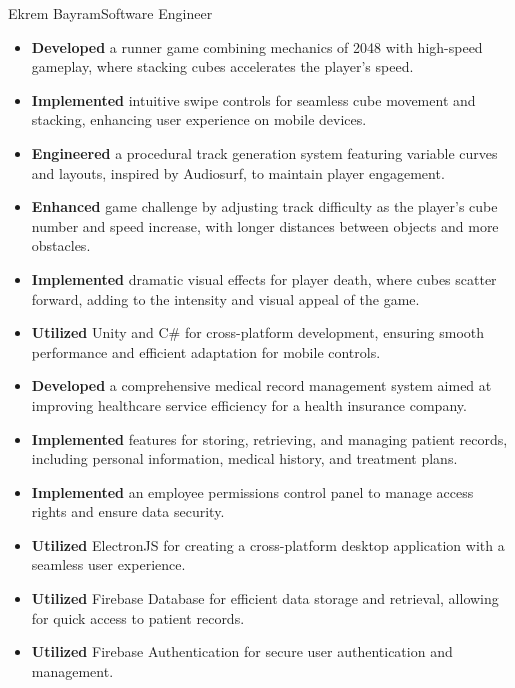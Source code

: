 \documentclass{article}
\begin{document}
\begin{cv}[avatar]{Ekrem Bayram}{Software Engineer}
    \cvseparator[2]
    \begin{cvevent}[2021]
        \begin{itemize}
            \item \textbf{Developed} a runner game combining mechanics of 2048 with high-speed gameplay, where stacking cubes accelerates the player's speed.
            \item \textbf{Implemented} intuitive swipe controls for seamless cube movement and stacking, enhancing user experience on mobile devices.
            \item \textbf{Engineered} a procedural track generation system featuring variable curves and layouts, inspired by Audiosurf, to maintain player engagement.
            \item \textbf{Enhanced} game challenge by adjusting track difficulty as the player's cube number and speed increase, with longer distances between objects and more obstacles.
            \item \textbf{Implemented} dramatic visual effects for player death, where cubes scatter forward, adding to the intensity and visual appeal of the game.
            \item \textbf{Utilized} Unity and C\# for cross-platform development, ensuring smooth performance and efficient adaptation for mobile controls.
        \end{itemize}
    \end{cvevent}

    \cvseparator[2]
    \begin{cvevent}[2021]
        \begin{itemize}
            \item \textbf{Developed} a comprehensive medical record management system aimed at improving healthcare service efficiency for a health insurance company.
            \item \textbf{Implemented} features for storing, retrieving, and managing patient records, including personal information, medical history, and treatment plans.
            \item \textbf{Implemented} an employee permissions control panel to manage access rights and ensure data security.
            \item \textbf{Utilized} ElectronJS for creating a cross-platform desktop application with a seamless user experience.
            \item \textbf{Utilized} Firebase Database for efficient data storage and retrieval, allowing for quick access to patient records.
            \item \textbf{Utilized} Firebase Authentication for secure user authentication and management.
        \end{itemize}
    \end{cvevent}


\end{cv}
\end{document}
